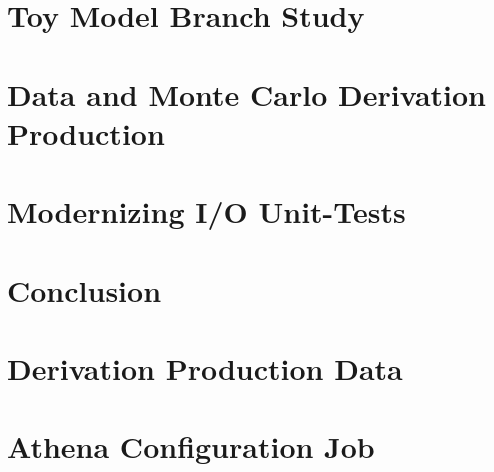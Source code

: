 \documentclass[12pt]{niuthesis}
\begin{document}
\chapter{Toy Model Branch Study}
\label{chap:Toy_Model}


\chapter{Data and Monte Carlo Derivation Production}
\label{chap:DAODProd}


\chapter{Modernizing I/O Unit-Tests}
\label{chap:Modernize}


\chapter{Conclusion}





\begingroup
{}
\setlength\bibitemsep{20pt}
\printbibliography[
    heading=bibintoc,
    title={REFERENCES}
]
\endgroup
\clearpage
\appendix

% 

\chapter{Derivation Production Data}


\chapter{Athena Configuration Job} \label{app:athena-job-config}

\end{document}

